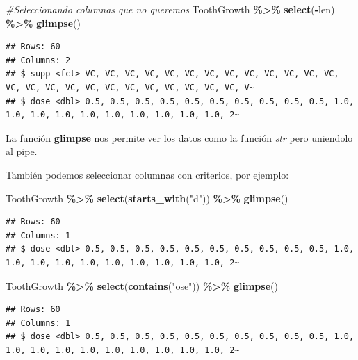 \documentclass[
]{book}
\newenvironment{Shaded}{\begin{snugshade}}{\end{snugshade}}
\newcommand{\CommentTok}[1]{\textcolor[rgb]{0.56,0.35,0.01}{\textit{#1}}}
\newcommand{\FunctionTok}[1]{\textcolor[rgb]{0.13,0.29,0.53}{\textbf{#1}}}
\newcommand{\NormalTok}[1]{#1}
\newcommand{\SpecialCharTok}[1]{\textcolor[rgb]{0.81,0.36,0.00}{\textbf{#1}}}
\newcommand{\StringTok}[1]{\textcolor[rgb]{0.31,0.60,0.02}{#1}}
\begin{document}
\begin{Shaded}
\begin{Highlighting}[]
\CommentTok{\#Seleccionando columnas que no queremos}
\NormalTok{ToothGrowth }\SpecialCharTok{\%\textgreater{}\%} \FunctionTok{select}\NormalTok{(}\SpecialCharTok{{-}}\NormalTok{len) }\SpecialCharTok{\%\textgreater{}\%} \FunctionTok{glimpse}\NormalTok{()}
\end{Highlighting}
\end{Shaded}

\begin{verbatim}
## Rows: 60
## Columns: 2
## $ supp <fct> VC, VC, VC, VC, VC, VC, VC, VC, VC, VC, VC, VC, VC, VC, VC, VC, VC, VC, VC, VC, VC, VC, VC, VC, VC, V~
## $ dose <dbl> 0.5, 0.5, 0.5, 0.5, 0.5, 0.5, 0.5, 0.5, 0.5, 0.5, 1.0, 1.0, 1.0, 1.0, 1.0, 1.0, 1.0, 1.0, 1.0, 1.0, 2~
\end{verbatim}

La función \textbf{glimpse} nos permite ver los datos como la función \emph{str} pero uniendolo al pipe.

También podemos seleccionar columnas con criterios, por ejemplo:\\

\begin{Shaded}
\begin{Highlighting}[]
\NormalTok{ToothGrowth }\SpecialCharTok{\%\textgreater{}\%} \FunctionTok{select}\NormalTok{(}\FunctionTok{starts\_with}\NormalTok{(}\StringTok{"d"}\NormalTok{)) }\SpecialCharTok{\%\textgreater{}\%} \FunctionTok{glimpse}\NormalTok{()}
\end{Highlighting}
\end{Shaded}

\begin{verbatim}
## Rows: 60
## Columns: 1
## $ dose <dbl> 0.5, 0.5, 0.5, 0.5, 0.5, 0.5, 0.5, 0.5, 0.5, 0.5, 1.0, 1.0, 1.0, 1.0, 1.0, 1.0, 1.0, 1.0, 1.0, 1.0, 2~
\end{verbatim}

\begin{Shaded}
\begin{Highlighting}[]
\NormalTok{ToothGrowth }\SpecialCharTok{\%\textgreater{}\%} \FunctionTok{select}\NormalTok{(}\FunctionTok{contains}\NormalTok{(}\StringTok{"ose"}\NormalTok{)) }\SpecialCharTok{\%\textgreater{}\%} \FunctionTok{glimpse}\NormalTok{()}
\end{Highlighting}
\end{Shaded}

\begin{verbatim}
## Rows: 60
## Columns: 1
## $ dose <dbl> 0.5, 0.5, 0.5, 0.5, 0.5, 0.5, 0.5, 0.5, 0.5, 0.5, 1.0, 1.0, 1.0, 1.0, 1.0, 1.0, 1.0, 1.0, 1.0, 1.0, 2~
\end{verbatim}
\end{document}
